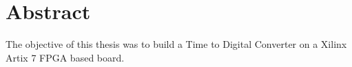 \chapter*{Abstract} %
\label{abtract}


The objective of this thesis was to build a Time to Digital Converter on a Xilinx Artix 7 FPGA based board. 





